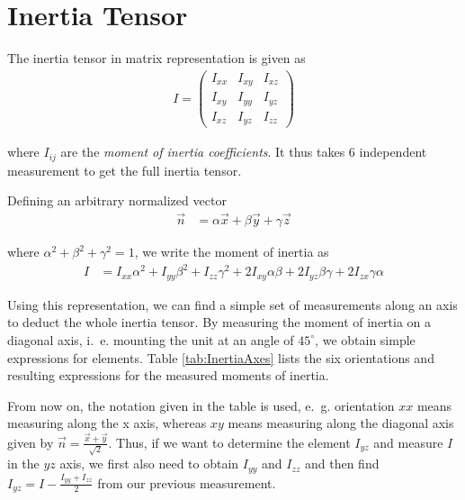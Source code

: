 \documentclass[journal]{IEEEtran}
\begin{document}
\section{Inertia Tensor}

The inertia tensor in matrix representation is given as
\begin{align}
	I = 
	\begin{pmatrix}
		I_{xx} & I_{xy} & I_{xz} \\
		I_{xy} & I_{yy} & I_{yz} \\
		I_{xz} & I_{yz} & I_{zz}
	\end{pmatrix}
\end{align}

where $I_{ij}$ are the \emph{moment of inertia coefficients}.
It thus takes 6 independent measurement to get the full inertia tensor.

Defining an arbitrary normalized vector
\begin{align}
	\vec{n} & = \alpha \vec{x} + \beta \vec{y} + \gamma \vec{z}
\end{align}

where $\alpha^2 + \beta^2 + \gamma^2 = 1$, we write the moment of inertia as \cite{book:goldstein}
\begin{align}
	I & = I_{xx} \alpha^2 + I_{yy} \beta^2 + I_{zz} \gamma^2 + 2 I_{xy} \alpha \beta + 2 I_{yz} \beta \gamma + 2 I_{zx} \gamma \alpha
\end{align}

Using this representation, we can find a simple set of measurements along an axis to deduct the whole inertia tensor.
By measuring the moment of inertia on a diagonal axis, i.~e. mounting the unit at an angle of $45^{\circ}$, we obtain simple expressions for elements.
Table \ref{tab:InertiaAxes} lists the six orientations and resulting expressions for the measured moments of inertia.

From now on, the notation given in the table is used, e.~g. orientation $xx$ means measuring along the x axis, whereas $xy$ means measuring along the diagonal axis given by $\vec{n} = \frac{\vec{x} + \vec{y}}{\sqrt{2}}$.
Thus, if we want to determine the element $I_{yz}$ and measure $I$ in the $yz$ axis, we first also need to obtain $I_{yy}$ and $I_{zz}$ and then find $I_{yz} = I - \frac{I_{yy} + I_{zz}}{2}$ from our previous measurement.
\end{document}
